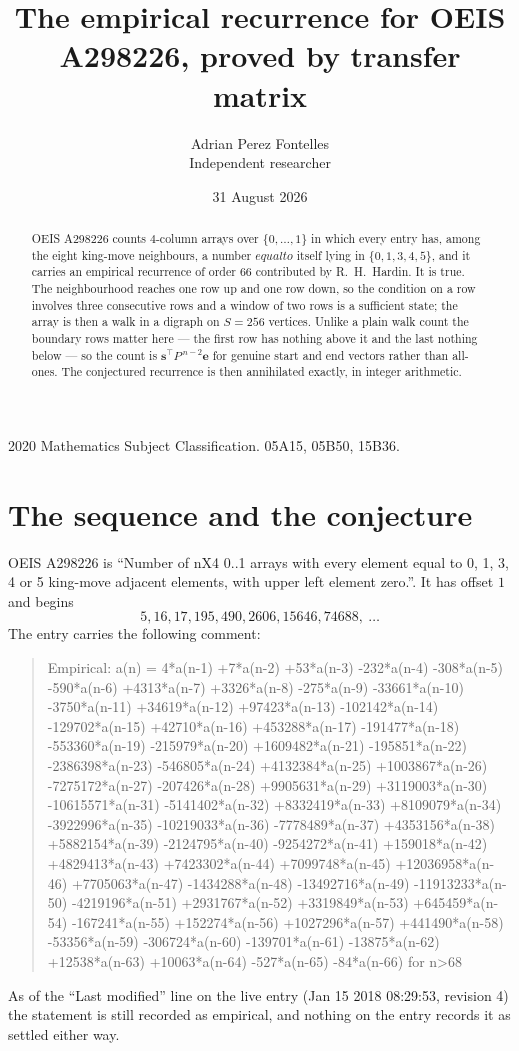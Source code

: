 \documentclass[11pt,a4paper]{article}
\title{The empirical recurrence for OEIS A298226, proved by transfer matrix}
\author{Adrian Perez Fontelles\\ \small Independent researcher}
\date{31 August 2026}
\theoremstyle{plain}
\theoremstyle{definition}
\begin{document}
\maketitle

\begin{abstract}
OEIS A298226 counts $4$-column arrays over $\{0,\dots,1\}$ in which every entry has,
among the eight king-move neighbours, a number $equal to$ itself lying in $\{0,1,3,4,5\}$, and it carries an empirical
recurrence of order $66$ contributed by R.~H.~Hardin. It is true. The neighbourhood
reaches one row up and one row down, so the condition on a row involves three consecutive
rows and a window of two rows is a sufficient state; the array is then a walk in a digraph
on $S=256$ vertices. Unlike a plain walk count the boundary rows matter here --- the first
row has nothing above it and the last nothing below --- so the count is
$\mathbf{s}^{\!\top}P^{\,n-2}\mathbf{e}$ for genuine start and end vectors rather than
all-ones. The conjectured recurrence is then annihilated exactly, in integer arithmetic.
\end{abstract}

\noindent\small 2020 Mathematics Subject Classification. 05A15, 05B50, 15B36.\normalsize

\section{The sequence and the conjecture}

OEIS A298226 is ``Number of nX4 0..1 arrays with every element equal to 0, 1, 3, 4 or 5 king-move adjacent elements, with upper left element zero.''. It has offset
$1$ and begins
\[
5, 16, 17, 195, 490, 2606, 15646, 74688,\ \dots
\]
The entry carries the following comment:
\begin{quote}\small
Empirical: a(n) = 4*a(n-1) +7*a(n-2) +53*a(n-3) -232*a(n-4) -308*a(n-5) -590*a(n-6) +4313*a(n-7) +3326*a(n-8) -275*a(n-9) -33661*a(n-10) -3750*a(n-11) +34619*a(n-12) +97423*a(n-13) -102142*a(n-14) -129702*a(n-15) +42710*a(n-16) +453288*a(n-17) -191477*a(n-18) -553360*a(n-19) -215979*a(n-20) +1609482*a(n-21) -195851*a(n-22) -2386398*a(n-23) -546805*a(n-24) +4132384*a(n-25) +1003867*a(n-26) -7275172*a(n-27) -207426*a(n-28) +9905631*a(n-29) +3119003*a(n-30) -10615571*a(n-31) -5141402*a(n-32) +8332419*a(n-33) +8109079*a(n-34) -3922996*a(n-35) -10219033*a(n-36) -7778489*a(n-37) +4353156*a(n-38) +5882154*a(n-39) -2124795*a(n-40) -9254272*a(n-41) +159018*a(n-42) +4829413*a(n-43) +7423302*a(n-44) +7099748*a(n-45) +12036958*a(n-46) +7705063*a(n-47) -1434288*a(n-48) -13492716*a(n-49) -11913233*a(n-50) -4219196*a(n-51) +2931767*a(n-52) +3319849*a(n-53) +645459*a(n-54) -167241*a(n-55) +152274*a(n-56) +1027296*a(n-57) +441490*a(n-58) -53356*a(n-59) -306724*a(n-60) -139701*a(n-61) -13875*a(n-62) +12538*a(n-63) +10063*a(n-64) -527*a(n-65) -84*a(n-66) for n>68
\end{quote}
As of the ``Last modified'' line on the live entry (Jan 15 2018 08:29:53, revision
4) the statement is still recorded as empirical, and nothing on the entry
records it as settled either way.
\end{document}

